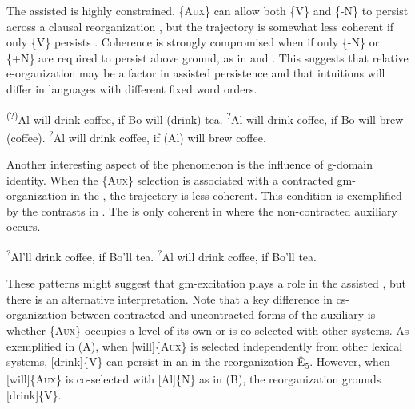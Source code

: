   The assisted  is highly constrained. \{A\textsc{ux}\} can allow both \{V\} and \{-N\} to persist across a clausal reorganization , but the trajectory is somewhat less coherent if only \{V\} persists . Coherence is strongly compromised when if only \{-N\} or \{+N\} are required to persist above ground, as in  and . This suggests that relative e-or\-ga\-ni\-za\-tion may be a factor in assisted persistence and that  intuitions will differ in languages with different fixed word orders. 

\ea\label{ex:7:4}
\label{ex:7:4a} \ex\label{ex:7:4b}\textsuperscript{(?)}Al will drink coffee, if Bo will (drink) tea.
\ex\label{ex:7:4c}\textsuperscript{?}Al will drink coffee, if Bo will brew (coffee).
\ex\label{ex:7:4d}\textsuperscript{?}Al will drink coffee, if (Al) will brew coffee.
\z
\z

  Another interesting aspect of the phenomenon is the influence of g-domain identity. When the \{A\textsc{ux}\} selection is associated with a contracted gm-or\-ga\-ni\-za\-tion in the , the  trajectory is less coherent. This condition is exemplified by the  contrasts in . The  is only coherent in  where the non-contracted auxiliary occurs.

\ea\label{ex:7:5}
\ea\label{ex:7:5a}\textsuperscript{?}Al’ll drink coffee, if Bo’ll tea.      
\ex\label{ex:7:5b}\textsuperscript{?}Al will drink coffee, if Bo’ll tea.
\label{ex:7:5c}
\z
\z

  These patterns might suggest that gm-excitation plays a role in the assisted , but there is an alternative interpretation. Note that a key difference in cs-or\-ga\-ni\-za\-tion between contracted and uncontracted forms of the auxiliary is whether \{A\textsc{ux}\} occupies a level of its own or is co-selected with other systems. As exemplified in {}(A), when [will]\{A\textsc{ux}\} is selected independently from other lexical systems, [drink]\{V\} can persist in an  in the reorganization Ê\textsubscript{5}. However, when [will]\{A\textsc{ux}\} is co-selected with [Al]\{N\} as in {}(B), the reorganization grounds [drink]\{V\}.


